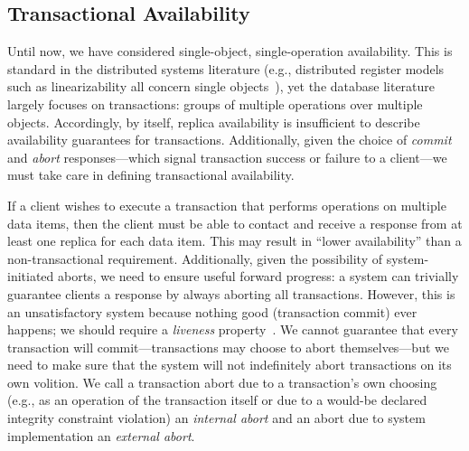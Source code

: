 
\subsection{Transactional Availability}

Until now, we have considered single-object, single-operation
availability. This is standard in the distributed systems literature
(e.g., distributed register models such as linearizability all concern
single objects~\cite{herlihy-art}), yet the database literature
largely focuses on transactions: groups of multiple operations over
multiple objects. Accordingly, by itself, replica availability is
insufficient to describe availability guarantees for
transactions. Additionally, given the choice of \textit{commit} and
\textit{abort} responses---which signal transaction success or failure
to a client---we must take care in defining transactional
availability.

If a client wishes to execute a transaction that performs operations
on multiple data items, then the client must be able to contact and
receive a response from at least one replica for each data item. This
may result in ``lower availability'' than a non-transactional
requirement. Additionally, given the possibility of system-initiated
aborts, we need to ensure useful forward progress: a system can
trivially guarantee clients a response by always aborting all
transactions. However, this is an unsatisfactory system because
nothing good (transaction commit) ever happens; we should require a
\textit{liveness} property~\cite{transaction-liveness}. We cannot
guarantee that every transaction will commit---transactions may choose
to abort themselves---but we need to make sure that the system will
not indefinitely abort transactions on its own volition. We call a
transaction abort due to a transaction's own choosing (e.g., as an
operation of the transaction itself or due to a would-be declared
integrity constraint violation) an \textit{internal abort} and an
abort due to system implementation an \textit{external abort}.

